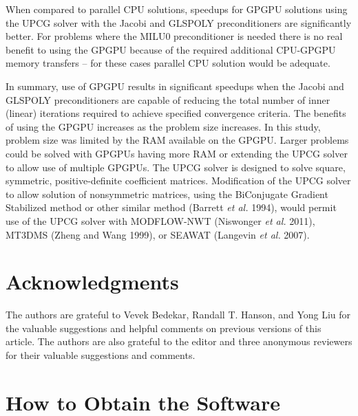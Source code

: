 \documentclass[12pt]{article}
\begin{document}
When compared to parallel CPU solutions, speedups for GPGPU solutions using the UPCG solver with the Jacobi and GLSPOLY preconditioners are significantly better. For problems where the MILU0 preconditioner is needed there is no real benefit to using the GPGPU because of the required additional CPU-GPGPU memory transfers -- for these cases parallel CPU solution would be adequate. 

In summary, use of GPGPU results in significant speedups when the Jacobi and GLSPOLY preconditioners are capable of reducing the total number of inner (linear) iterations required to achieve specified convergence criteria. The benefits of using the GPGPU increases as the problem size increases. In this study, problem size was limited by the RAM available on the GPGPU. Larger problems could be solved with GPGPUs having more RAM or extending the UPCG solver to allow use of multiple GPGPUs. The UPCG solver is designed to solve  square, symmetric, positive-definite coefficient matrices. Modification of the UPCG solver to allow solution of nonsymmetric matrices, using the BiConjugate Gradient Stabilized method or other similar method (Barrett \textit{et al.} 1994), would permit use of the UPCG solver with MODFLOW-NWT (Niswonger \textit{et al.} 2011), MT3DMS (Zheng and Wang 1999), or SEAWAT (Langevin \textit{et al.} 2007).
 

\section* {\bf Acknowledgments}

The authors are grateful to Vevek Bedekar, Randall T. Hanson, and Yong Liu for the valuable suggestions and helpful comments on previous versions of this article. The authors are also grateful to the editor and three anonymous reviewers for their valuable suggestions and comments.


\color{blue}
\section* {\bf How to Obtain the Software}
\end{document}
